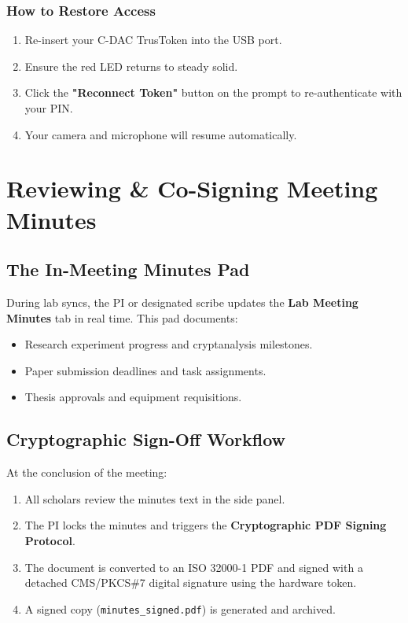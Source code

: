 \documentclass[11pt,a4paper]{report}
\begin{document}
\subsection{How to Restore Access}
\begin{enumerate}[noitemsep]
    \item Re-insert your C-DAC TrusToken into the USB port.
    \item Ensure the red LED returns to steady solid.
    \item Click the \textbf{"Reconnect Token"} button on the prompt to re-authenticate with your PIN.
    \item Your camera and microphone will resume automatically.
\end{enumerate}

\newpage
\chapter{Reviewing \& Co-Signing Meeting Minutes}

\section{The In-Meeting Minutes Pad}
During lab syncs, the PI or designated scribe updates the \textbf{Lab Meeting Minutes} tab in real time. This pad documents:
\begin{itemize}[noitemsep]
    \item Research experiment progress and cryptanalysis milestones.
    \item Paper submission deadlines and task assignments.
    \item Thesis approvals and equipment requisitions.
\end{itemize}

\section{Cryptographic Sign-Off Workflow}
At the conclusion of the meeting:
\begin{enumerate}
    \item All scholars review the minutes text in the side panel.
    \item The PI locks the minutes and triggers the \textbf{Cryptographic PDF Signing Protocol}.
    \item The document is converted to an ISO 32000-1 PDF and signed with a detached CMS/PKCS\#7 digital signature using the hardware token.
    \item A signed copy (\texttt{minutes\_signed.pdf}) is generated and archived.
\end{enumerate}
\end{document}
